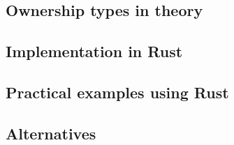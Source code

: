 \documentclass[sigplan,11pt,nonacm]{acmart}
\begin{document}
\subsection{Ownership types in theory}


\subsection{Implementation in Rust}






\subsection{Practical examples using Rust}


\subsection{Alternatives}
\end{document}
